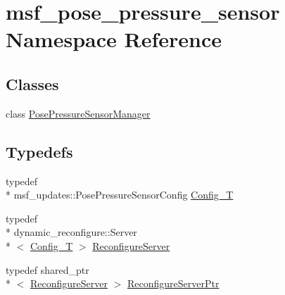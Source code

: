 \hypertarget{namespacemsf__pose__pressure__sensor}{\section{msf\-\_\-pose\-\_\-pressure\-\_\-sensor Namespace Reference}
\label{namespacemsf__pose__pressure__sensor}
}
\subsection*{Classes}
\begin{DoxyCompactItemize}
\item 
class \hyperlink{classmsf__pose__pressure__sensor_1_1PosePressureSensorManager}{Pose\-Pressure\-Sensor\-Manager}
\end{DoxyCompactItemize}
\subsection*{Typedefs}
\begin{DoxyCompactItemize}
\item 
typedef \\*
msf\-\_\-updates\-::\-Pose\-Pressure\-Sensor\-Config \hyperlink{namespacemsf__pose__pressure__sensor_a2c4cfe42f9dab2046f445854ea6e36b8}{Config\-\_\-\-T}
\item 
typedef \\*
dynamic\-\_\-reconfigure\-::\-Server\\*
$<$ \hyperlink{namespacemsf__pose__pressure__sensor_a2c4cfe42f9dab2046f445854ea6e36b8}{Config\-\_\-\-T} $>$ \hyperlink{namespacemsf__pose__pressure__sensor_ad27bcff9b153b9f261ebd07114344368}{Reconfigure\-Server}
\item 
typedef shared\-\_\-ptr\\*
$<$ \hyperlink{namespacemsf__pose__pressure__sensor_ad27bcff9b153b9f261ebd07114344368}{Reconfigure\-Server} $>$ \hyperlink{namespacemsf__pose__pressure__sensor_a76e4a89437dafa8944e50322b9d93903}{Reconfigure\-Server\-Ptr}
\end{DoxyCompactItemize}


